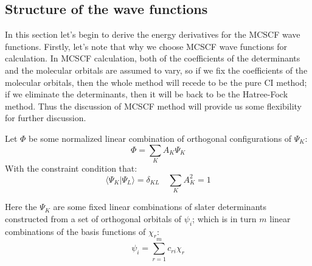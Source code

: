 \subsection{Structure of the wave functions}
%
%
%
In this section let's begin to derive the energy derivatives for the
MCSCF wave functions. Firstly, let's note that why we choose MCSCF
wave functions for calculation. In MCSCF calculation, both of the
coefficients of the determinants and the molecular orbitals are
assumed to vary, so if we fix the coefficients of the molecular
orbitals, then the whole method will recede to be the pure CI method;
if we eliminate the determinants, then it will be back to be the
Hatree-Fock method. Thus the discussion of MCSCF method will provide
us some flexibility for further discussion.

Let $\Phi$ be some normalized linear combination of orthogonal
configurations of $\Psi_{K}$:
\begin{equation}\label{}
  \Phi = \sum_{K}A_{K}\Psi_{K}
\end{equation}
With the constraint condition that:
\begin{equation}\label{}
  \langle\Psi_{K}|\Psi_{L}\rangle = \delta_{KL} \quad
  \sum_{K}A_{K}^{2} = 1
\end{equation}

Here the $\Psi_{K}$ are some fixed linear combinations of slater
determinants constructed from a set of orthogonal orbitals of
$\psi_{i}$; which is in turn $m$ linear combinations of the basis
functions of $\chi_{r}$:
\begin{equation}\label{PULAYeq:25}
  \psi_{i} = \sum_{r=1}^{m}c_{ri}\chi_{r}
\end{equation}

